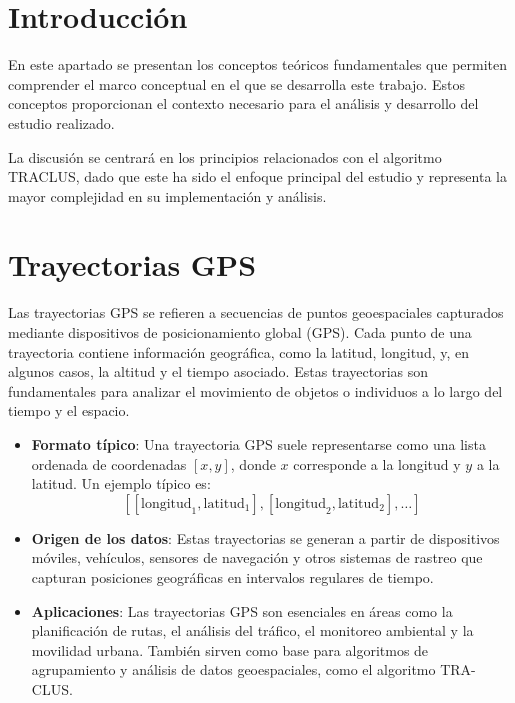 
\section{Introducción}

En este apartado se presentan los conceptos teóricos fundamentales que permiten comprender el marco conceptual en el que se desarrolla este trabajo. Estos conceptos proporcionan el contexto necesario para el análisis y desarrollo del estudio realizado.

La discusión se centrará en los principios relacionados con el algoritmo TRACLUS, dado que este ha sido el enfoque principal del estudio y representa la mayor complejidad en su implementación y análisis.

\section{Trayectorias GPS}

Las trayectorias GPS se refieren a secuencias de puntos geoespaciales capturados mediante dispositivos de posicionamiento global (GPS). Cada punto de una trayectoria contiene información geográfica, como la latitud, longitud, y, en algunos casos, la altitud y el tiempo asociado. Estas trayectorias son fundamentales para analizar el movimiento de objetos o individuos a lo largo del tiempo y el espacio.

\begin{itemize}
    \item \textbf{Formato típico}: Una trayectoria GPS suele representarse como una lista ordenada de coordenadas \([x, y]\), donde \(x\) corresponde a la longitud y \(y\) a la latitud. Un ejemplo típico es:
    \[
    [[\text{longitud}_1, \text{latitud}_1], [\text{longitud}_2, \text{latitud}_2], \dots]
    \]
    \item \textbf{Origen de los datos}: Estas trayectorias se generan a partir de dispositivos móviles, vehículos, sensores de navegación y otros sistemas de rastreo que capturan posiciones geográficas en intervalos regulares de tiempo.
    \item \textbf{Aplicaciones}: Las trayectorias GPS son esenciales en áreas como la planificación de rutas, el análisis del tráfico, el monitoreo ambiental y la movilidad urbana. También sirven como base para algoritmos de agrupamiento y análisis de datos geoespaciales, como el algoritmo TRA-CLUS.
\end{itemize}

